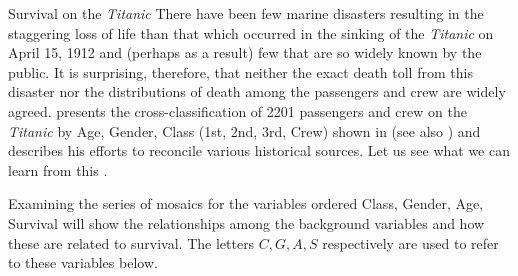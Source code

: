\begin{Example}[titanic]{Survival on the \emph{Titanic}}
There have been few marine disasters resulting in the staggering loss of life
than that
which occurred in the sinking of the \emph{Titanic} on April 15, 1912
and (perhaps as a result) few that are so widely known by the public.
It is surprising, therefore, that
neither the exact death toll from this disaster
nor the distributions of death among the passengers
and crew are widely agreed.
\citet[Table 2]{Dawson:95} presents the cross-classification of
2201 passengers and crew on the \emph{Titanic} by Age, Gender, Class
(1st, 2nd, 3rd, Crew) shown in  
(see also )
and describes his efforts to reconcile various historical sources.
Let us see what we can learn from this \Dset.



Examining the series of mosaics for the variables ordered
Class, Gender, Age, Survival will show the relationships among
the background variables and how these are related to survival.
The letters $C, G, A, S$ respectively are used to refer to these variables
below.


\end{Example}
